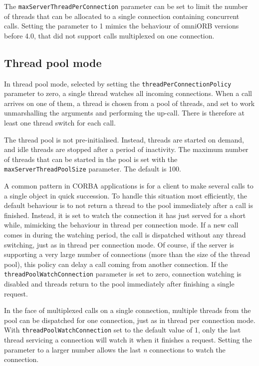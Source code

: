 \documentclass[11pt,twoside,a4paper]{book}
\newcommand{\code}[1]{\texttt{#1}}
\newcommand{\dsc}{\discretionary{}{}{}}
\begin{document}
The \code{maxServerThreadPerConnection} parameter can be set to limit
the number of threads that can be allocated to a single connection
containing concurrent calls. Setting the parameter to 1 mimics the
behaviour of omniORB versions before 4.0, that did not support
calls multiplexed on one connection.


\subsection{Thread pool mode}
\label{sec:watchConn}

In thread pool mode, selected by setting the
\code{threadPerConnectionPolicy} parameter to zero, a single thread
watches all incoming connections. When a call arrives on one of them,
a thread is chosen from a pool of threads, and set to work
unmarshalling the arguments and performing the up-call. There is
therefore at least one thread switch for each call.

The thread pool is not pre-initialised. Instead, threads are started
on demand, and idle threads are stopped after a period of inactivity.
The maximum number of threads that can be started in the pool is set
with the \code{maxServer\dsc{}ThreadPoolSize} parameter. The default
is 100.

A common pattern in CORBA applications is for a client to make several
calls to a single object in quick succession. To handle this situation
most efficiently, the default behaviour is to not return a thread to
the pool immediately after a call is finished. Instead, it is set to
watch the connection it has just served for a short while, mimicking
the behaviour in thread per connection mode. If a new call comes in
during the watching period, the call is dispatched without any thread
switching, just as in thread per connection mode. Of course, if the
server is supporting a very large number of connections (more than the
size of the thread pool), this policy can delay a call coming from
another connection. If the \code{threadPoolWatch\dsc{}Connection}
parameter is set to zero, connection watching is disabled and threads
return to the pool immediately after finishing a single request.

In the face of multiplexed calls on a single connection, multiple
threads from the pool can be dispatched for one connection, just as in
thread per connection mode. With \code{threadPoolWatchConnection} set
to the default value of 1, only the last thread servicing a connection
will watch it when it finishes a request. Setting the parameter to a
larger number allows the last \emph{n} connections to watch the
connection.
\end{document}
